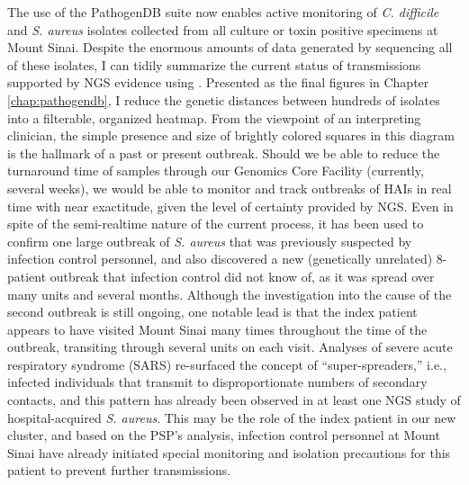 The use of the PathogenDB suite now enables active monitoring of \emph{C. difficile} and \emph{S. aureus} isolates collected from all culture or toxin positive specimens at Mount Sinai. Despite the enormous amounts of data generated by sequencing all of these isolates, I can tidily summarize the current status of transmissions supported by NGS evidence using \pathogendbviz. Presented as the final figures in Chapter \ref{chap:pathogendb}, I reduce the genetic distances between hundreds of isolates into a filterable, organized heatmap. From the viewpoint of an interpreting clinician, the simple presence and size of brightly colored squares in this diagram is the hallmark of a past or present outbreak. Should we be able to reduce the turnaround time of samples through our Genomics Core Facility (currently, several weeks), we would be able to monitor and track outbreaks of HAIs in real time with near exactitude, given the level of certainty provided by NGS. Even in spite of the semi-realtime nature of the current process, it has been used to confirm one large outbreak of \emph{S. aureus} that was previously suspected by infection control personnel, and also discovered a new (genetically unrelated) 8-patient outbreak that infection control did not know of, as it was spread over many units and several months. Although the investigation into the cause of the second outbreak is still ongoing, one notable lead is that the index patient appears to have visited Mount Sinai many times throughout the time of the outbreak, transiting through several units on each visit. Analyses of severe acute respiratory syndrome (SARS) re-surfaced the concept of ``super-spreaders,'' i.e., infected individuals that transmit to disproportionate numbers of secondary contacts,\autocite{Stein2011} and this pattern has already been observed in at least one NGS study of hospital-acquired \emph{S. aureus}.\autocite{Tong2015} This may be the role of the index patient in our new cluster, and based on the PSP's analysis, infection control personnel at Mount Sinai have already initiated special monitoring and isolation precautions for this patient to prevent further transmissions.

